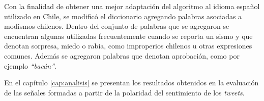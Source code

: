 Con la finalidad de obtener una mejor adaptación del algoritmo al idioma español utilizado en Chile, se modificó el diccionario agregando palabras asociadas a modismos chilenos.
%
Dentro del conjunto de palabras que se agregaron se encuentran algunas utilizadas frecuentemente cuando se reporta un sismo y que denotan sorpresa, miedo o rabia, como improperios chilenos u otras expresiones comunes.
%
Además se agregaron palabras que denotan aprobación, como por ejemplo \textit{``bacán''}.

En el capítulo \ref{cap:analisis} se presentan los resultados obtenidos en la evaluación de las señales formadas a partir de la polaridad del sentimiento de los \textit{tweets}.




